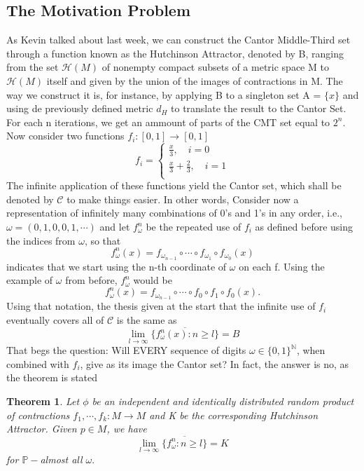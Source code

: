 \documentclass{article}
\newtheorem*{theo*}{Theorem}
\begin{document}
\subsection{The Motivation Problem}
  As Kevin talked about last week, we can construct the Cantor Middle-Third set through a function known as the Hutchinson Attractor, denoted by B, ranging
from the set $\mathcal{H}(M)$ of nonempty compact subsets of a metric space M to $\mathcal{H}(M)$ itself and given by the union of the images of 
contractions in M. The way we construct it is, for instance, by applying B to a singleton set A = $\{x\}$ and using de previously defined metric $d_{H}$ to translate
the result to the Cantor Set. For each n iterations, we get an ammount of parts of the CMT set equal to $2^{n}.$ 
Now consider two functions $f_{i}:[0,1]\rightarrow [0, 1]$
  $$
    f_{i} = \left\{\begin{array}{ll}
        \frac{x}{3}, \quad i=0\\
        \frac{x}{3}+\frac{2}{3}, \quad i=1\\
      \end{array}\right.
  $$
  The infinite application of these functions yield the Cantor set, which shall be denoted by $\mathcal{C}$ to make things easier. In other words,
Consider now a representation of infinitely many combinations of 0's and 1's in any order, i.e., $\omega = (0, 1, 0, 0, 1, \cdots)$ and
let $f_{\omega}^{n}$ be the repeated use of $f_{i}$ as defined before using the indices from $\omega$, so that
  $$
  f_{\omega}^{n}(x) = f_{\omega_{n-1}}\circ{\cdots}\circ{f_{\omega_{1}}}\circ{f_{\omega_{0}}}(x)
  $$
  indicates that we start using the n-th coordinate of $\omega$ on each f. Using the example of $\omega$ from before, $f_{\omega}^{n}$
  would be
  $$
    f_{\omega}^{n}(x) = f_{\omega_{n-1}}\circ{\cdots}\circ{f_{0}}\circ{f_{1}}\circ{f_{0}}(x).
  $$
  Using that notation, the thesis given at the start that the infinite use of $f_{i}$ eventually covers all of $\mathcal{C}$ is the same as
  $$
  \lim_{l\to\infty}\overline{\{f_{\omega}^{n}(x):n\geq{l}\}} = B
  $$
  That begs the question: Will EVERY sequence of digits $\omega\in\{0, 1\}^{\mathbb{N}}$, when combined with $f_{i}$, give 
as its image the Cantor set? In fact, the answer is no, as the theorem is stated
 \begin{theo*}
   Let $\phi$ be an independent and identically distributed random product of contractions $f_{1},\cdots, f_{k}:M\rightarrow M$ and
  K be the corresponding Hutchinson Attractor. Given $p\in M$, we have
    $$
    \lim_{l\to\infty}\overline{\{f_{\omega}^{n}:n\geq{l}\}} = K
    $$
    for $\mathbb{P}-$almost all $\omega.$
 \end{theo*}
\end{document}
